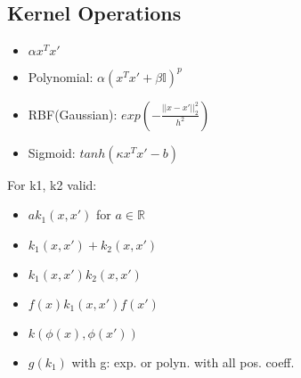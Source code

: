 \subsection{Kernel Operations}

\begin{itemize}
    \item $\alpha x^Tx'$
    \item Polynomial: $\alpha(x^Tx' + \beta\mathbb{I})^p$
    \item RBF(Gaussian): $exp(-\frac{||x-x'||^2_2}{h^2})$
    \item Sigmoid: $tanh(\kappa x^Tx' - b)$
\end{itemize}
For k1, k2 valid:
\begin{multicols*}{2}
    \begin{itemize}
        \item $ak_1(x,x')$ for $a\in\mathbb{R}$
        \item $k_1(x,x') + k_2(x,x')$
        \item $k_1(x,x')k_2(x,x')$
        \item $f(x)k_1(x,x')f(x')$
        \item $k(\phi(x),\phi(x'))$
        \item $g(k_1)$ with g: exp. or polyn. with all pos. coeff.
    \end{itemize}
\end{multicols*}